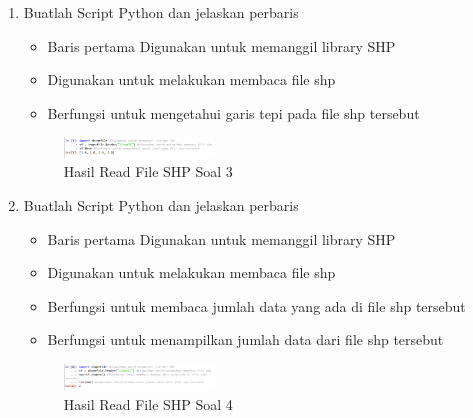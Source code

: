 \begin{enumerate}
    \item Buatlah Script Python dan jelaskan perbaris
    
    \hfill\break
    \begin{itemize}
        \item Baris pertama Digunakan untuk memanggil library SHP
        \item Digunakan untuk melakukan membaca file shp
        \item Berfungsi untuk mengetahui garis tepi pada file shp tersebut
    \end{itemize}
    \hfill\break
    \begin{figure}[H]
		\includegraphics[width=4cm]{figures/1174021/3/soal3.PNG}
		\centering
		\caption{Hasil Read File SHP Soal 3}
    \end{figure}
    
    \item Buatlah Script Python dan jelaskan perbaris
    
    \hfill\break
     \begin{itemize}
        \item Baris pertama Digunakan untuk memanggil library SHP
        \item Digunakan untuk melakukan membaca file shp
        \item Berfungsi untuk membaca jumlah data yang ada di file shp tersebut
        \item Berfungsi untuk menampilkan jumlah data dari file shp tersebut
    \end{itemize}
    \hfill\break
    \begin{figure}[H]
		\includegraphics[width=4cm]{figures/1174021/3/soal4.PNG}
		\centering
		\caption{Hasil Read File SHP Soal 4}
    \end{figure}
    

\end{enumerate}
